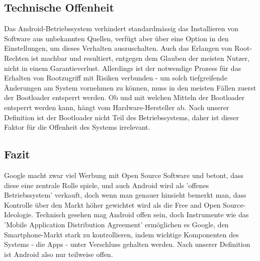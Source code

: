 \subsection{Technische Offenheit}
Das Android-Betriebssystem verhindert standardmässig das Installieren von Software aus unbekannten Quellen, verfügt aber über eine Option in den Einstellungen, um dieses Verhalten auszuschalten. Auch das Erlangen von Root-Rechten ist machbar und resultiert, entgegen dem Glauben der meisten Nutzer, nicht in einem Garantieverlust\cite{online:xda-rooting-warranty}. Allerdings ist der notwendige Prozess für das Erhalten von Rootzugriff mit Risiken verbunden - um solch tiefgreifende Änderungen am System vornehmen zu können, muss in den meisten Fällen zuerst der Bootloader entsperrt werden. 
Ob und mit welchen Mitteln der Bootloader entsperrt werden kann, hängt vom Hardware-Hersteller ab\cite{online:apu-what-is-unlocking}. Nach unserer Definition ist der Bootloader nicht Teil des Betriebssystems, daher ist dieser Faktor für die Offenheit des Systems irrelevant.

\subsection{Fazit}
Google macht zwar viel Werbung mit Open Source Software und betont, dass diese eine zentrale Rolle spiele\cite{online:google-open-source}, und auch Android wird als 'offenes Betriebssystem' verkauft\cite{online:android-open-source}, doch wenn man genauer hinsieht bemerkt man, dass Kontrolle über den Markt höher gewichtet wird als die Free and Open Source-Ideologie. Technisch gesehen mag Android offen sein, doch Instrumente wie das 'Mobile Application Distribution Agreement' ermöglichen es Google, den Smartphone-Markt stark zu kontrollieren, indem wichtige Komponenten des Systems - die Apps - unter Verschluss gehalten werden. 
Nach unserer Definition ist Android also nur teilweise offen.
